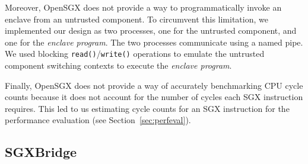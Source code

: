 \documentclass[../main.tex]{subfiles}
\begin{document}
Moreover, OpenSGX does not provide a way to programmatically invoke an
enclave from an untrusted component. To circumvent this limitation, we
implemented our design as two processes, one for the untrusted
component, and one for the \textit{enclave program}. The two processes
communicate using a named pipe. We used blocking
\texttt{read()}/\texttt{write()} operations to emulate the untrusted
component switching contexts to execute the \textit{enclave program}.

Finally, OpenSGX does not provide a way of accurately benchmarking
CPU cycle counts because it does not account for the number of cycles
each SGX instruction requires. This led to us estimating cycle counts
for an SGX instruction for the performance evaluation (see
Section~\ref{sec:perfeval}).




%

\subsection{SGXBridge}
\label{subsec:sgxbridge}
\end{document}
